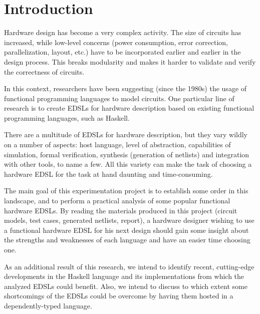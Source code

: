 \section{Introduction}
\label{sec:intro}

    Hardware design has become a very complex activity. The size of circuits has increased, while
    low-level concerns (power consumption, error correction, parallelization, layout, etc.) have to
    be incorporated earlier and earlier in the design process. This breaks modularity and makes it
    harder to validate and verify the correctness of circuits.

     In this context, researchers have been
    suggesting (since the 1980s) the usage of functional programming languages to model circuits.
    One particular line of research is to create \acp{EDSL} for hardware description based on
    existing functional programming languages, such as Haskell.

    There are a multitude of \acp{EDSL} for hardware description, but they vary wildly on a number
    of aspects: host language, level of abstraction, capabilities of simulation, formal
    verification, synthesis (generation of netlists) and integration with other tools, to name a
    few. All this variety can make the task of choosing a hardware EDSL for the task at hand
    daunting and time-consuming.

    The main goal of this experimentation project is to establish some order in this landscape, and
    to perform a practical analysis of some popular functional hardware \acp{EDSL}. By reading the
    materials produced in this project (circuit models, test cases, generated netlists, report), a
    hardware designer wishing to use a functional hardware \ac{EDSL} for his next design should gain
    some insight about the strengths and weaknesses of each language and have an easier time
    choosing one.

    As an additional result of this research, we intend to identify recent, cutting-edge
    developments in the Haskell language and its implementations from which the analyzed \acp{EDSL}
    could benefit. Also, we intend to discuss to which extent some shortcomings of the \acp{EDSL}
    could be overcome by having them hosted in a dependently-typed language.
